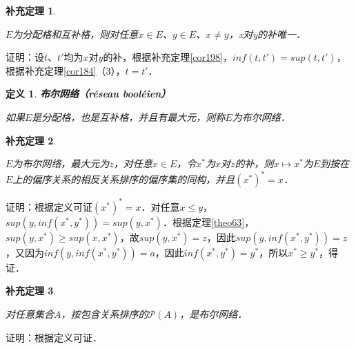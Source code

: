 \documentclass[12pt, a4paper, oneside]{book}
\newtheorem{cor}{补充定理}
\newtheorem{de}{定义}
\begin{document}
			\begin{cor}\label{cor200}
				\hfill\par
				$E$为分配格和互补格，则对任意$x\in E$、$y\in E$、$x\neq y$，x对y的补唯一．
			\end{cor}
			证明：设$t$、$t'$均为$x$对$y$的补，根据补充定理\ref{cor198}，$inf(t, t')=sup(t, t')$，根据补充定理\ref{cor184}（3），$t=t'$．

			\begin{de}
				\textbf{布尔网络（réseau booléien）}
				\par
				如果$E$是分配格，也是互补格，并且有最大元，则称$E$为布尔网络．				
			\end{de}

			\begin{cor}\label{cor201}
				\hfill\par
				$E$为布尔网络，最大元为$z$，对任意$x\in E$，令$x^*$为$x$对$z$的补，则$x\mapsto x^*$为$E$到按在$E$上的偏序关系的相反关系排序的偏序集的同构，并且$(x^*)^*=x$．
			\end{cor}
			证明：根据定义可证$(x^*)^*=x$．对任意$x\leq y$，$sup(y, inf(x^*, y^*))=sup(y, x^*)$．根据定理\ref{theo63}，$sup(y, x^*)\geq sup(x, x^*)$，故$sup(y, x^*)=z$，因此$sup(y, inf(x^*, y^*))=z$，又因为$inf(y, inf(x^*, y^*))=a$，因此$inf(x^*, y^*)=y^*$，所以$x^*\geq y^*$，得证．
									
			\begin{cor}\label{cor202}
				\hfill\par
				对任意集合$A$，按包含关系排序的$\mathcal{P}(A)$，是布尔网络．
			\end{cor}
			证明：根据定义可证．
			
\end{document}
